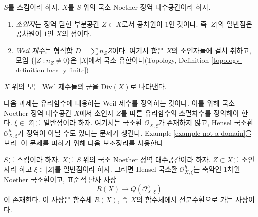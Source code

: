 \begin{definition}
\label{definition-Weil-divisor}
$S$를 스킴이라 하자. $X$를 $S$ 위의 국소 Noether 정역 대수공간이라
하자.
\begin{enumerate}
\item {\it 소인자}는 정역 닫힌 부분공간 $Z \subset X$로서 공차원이
$1$인 것이다. 즉 $|Z|$의 일반점은 공차원이 $1$인 $X$의 점이다.
\item {\it Weil 제수}는 형식합 $D = \sum n_Z Z$이다. 여기서 합은
$X$의 소인자들에 걸쳐 취하고, 모임
$\{|Z| : n_Z \not = 0\}$은 $|X|$에서 국소 유한이다(Topology,
Definition \ref{topology-definition-locally-finite}).
\end{enumerate}
$X$ 위의 모든 Weil 제수들의 군을 $\text{Div}(X)$로 나타낸다.
\end{definition}

\noindent
다음 과제는 유리함수에 대응하는 Weil 제수를 정의하는 것이다. 이를
위해 국소 Noether 정역 대수공간 $X$에서 소인자 $Z$를 따른 유리함수의
소멸차수를 정의해야 한다. $\xi \in |Z|$를 일반점이라 하자. 여기서는
국소환 $\mathcal{O}_{X, \xi}$가 존재하지 않고, Hensel 국소환
$\mathcal{O}_{X, \xi}^h$가 정역이 아닐 수도 있다는 문제가 생긴다.
Example \ref{example-not-a-domain}을 보라. 이 문제를 피하기 위해 다음
보조정리를 사용한다.

\begin{lemma}
\label{lemma-order-vanishing}
$S$를 스킴이라 하자. $X$를 $S$ 위의 국소 Noether 정역 대수공간이라
하자. $Z \subset X$를 소인자라 하고 $\xi \in |Z|$를 일반점이라 하자.
그러면 Hensel 국소환 $\mathcal{O}_{X, \xi}^h$는 축약인 $1$차원 Noether
국소환이고, 표준적 단사 사상
$$
R(X) \longrightarrow Q(\mathcal{O}_{X, \xi}^h)
$$
이 존재한다. 이 사상은 함수체 $R(X)$, 즉 $X$의 함수체에서
전분수환으로 가는 사상이다.
\end{lemma}

